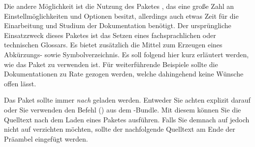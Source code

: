 \documentclass[%
  english,ngerman,%
  cdgeometry=no,DIV=12,automark%
]{tudscrartcl}
\begin{document}
Die andere Möglichkeit ist die Nutzung des Paketes , das 
eine große Zahl an Einstellmöglichkeiten und Optionen besitzt, allerdings auch 
etwas Zeit für die Einarbeitung und Studium der Dokumentation benötigt. Der 
ursprüngliche Einsatzzweck dieses Paketes ist das Setzen eines fachsprachlichen 
oder technischen Glossars. Es bietet zusätzlich die Mittel zum Erzeugen eines 
Abkürzungs- sowie Symbolverzeichnis. Es soll folgend hier kurz erläutert 
werden, wie das Paket zu verwenden ist. Für weiterführende Beispiele sollte 
die Dokumentationen zu Rate gezogen werden, welche dahingehend keine Wünsche 
offen lässt. 

Das Paket  sollte immer \emph{nach}  
geladen werden. Entweder Sie achten explizit darauf oder Sie verwenden den 
Befehl () aus dem \KOMAScript-Bundle. Mit 
diesem können Sie die Quelltext nach dem Laden eines Paketes ausführen. 
Falls Sie demnach auf  jedoch nicht auf  
verzichten möchten, sollte der nachfolgende Quelltext am Ende der Präambel 
eingefügt werden.
\end{document}
